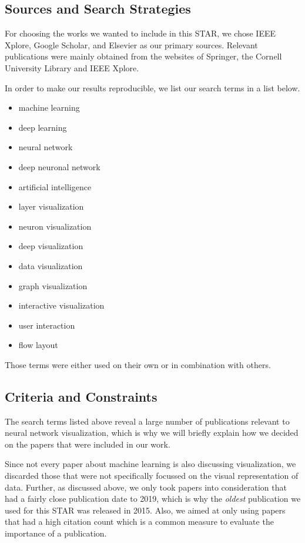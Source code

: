 \documentclass{acmsiggraph}               %
\begin{document}
\subsection{Sources and Search Strategies}
For choosing the works we wanted to include in this STAR, we chose IEEE Xplore, Google Scholar, and Elsevier as our primary sources. Relevant publications were mainly obtained from the websites of Springer, the Cornell University Library and IEEE Xplore.

In order to make our results reproducible, we list our search terms in a list below.

\begin{multicols}{2}
\begin{itemize}
\item machine learning
\item deep learning
\item neural network
\item deep neuronal network
\item artificial intelligence
\item layer visualization
\item neuron visualization
\item deep visualization
\item data visualization
\item graph visualization
\item interactive visualization
\item user interaction
\item flow layout
\end{itemize}
\end{multicols}

Those terms were either used on their own or in combination with others.

\subsection{Criteria and Constraints}
The search terms listed above reveal a large number of publications relevant to neural network visualization, which is why we will briefly explain how we decided on the papers that were included in our work.

Since not every paper about machine learning is also discussing visualization, we discarded those that were not specifically focussed on the visual representation of data. Further, as discussed above, we only took papers into consideration that had a fairly close publication date to 2019, which is why the \textit{oldest} publication we used for this STAR was released in 2015. Also, we aimed at only using papers that had a high citation count which is a common measure to evaluate the importance of a publication.
\end{document}
